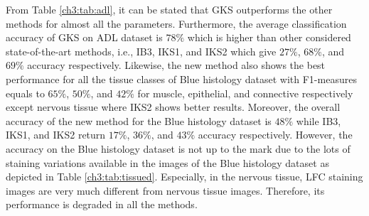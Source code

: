 From Table \ref{ch3:tab:adl}, it can be stated that GKS outperforms the other methods for almost all the parameters. Furthermore, the average classification accuracy of GKS on ADL dataset is $78\%$ which is higher than other considered state-of-the-art methods, i.e., IB3, IKS1, and IKS2 which give $27\%$, $68\%$, and $69\%$ accuracy respectively. Likewise, the new method also shows the best performance for all the tissue classes of Blue histology dataset with F1-measures equals to $65\%$, $50\%$, and $42\%$  for muscle, epithelial, and connective respectively except nervous tissue where IKS2 shows better results. Moreover, the overall accuracy of the new method for the Blue histology dataset is $48\%$ while IB3, IKS1, and IKS2 return $17\%$, $36\%$, and $43\%$ accuracy respectively. However, the accuracy on the Blue histology dataset is not up to the mark due to the lots of staining variations available in the images of the Blue histology dataset as depicted in Table \ref{ch3:tab:tissued}. Especially, in the nervous tissue, LFC staining images are very much different from nervous tissue images. Therefore, its performance is degraded in all the methods.

